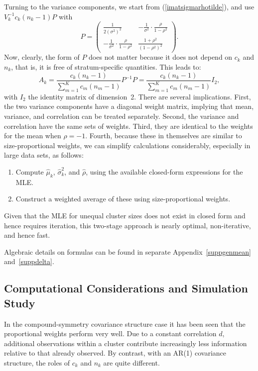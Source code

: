 \documentclass[11pt,a5paper,twoside]{book}
\begin{document}
Turning to the variance components, we start from (\ref{imatsigmarhotilde}), and use $V_k^{-1}c_k(n_k-1)P$ with
$$
P= \left(
\begin{array}{cc}
\frac{1}{2(\sigma^2)^2}
&
-\frac{1}{\sigma^2}\cdot\frac{\rho}{1-\rho^2}\\
-\frac{1}{\sigma^2}\cdot\frac{\rho}{1-\rho^2}&
\frac{1+\rho^2}{(1-\rho^2)^2}
\end{array}
\right).
$$
Now, clearly, the form of $P$ does not matter because it does not depend on $c_k$ and $n_k$, that is, it is free of stratum-specific quantities. This leads to:
$$A_k=
\frac{c_k(n_k-1)}{\sum_{m=1}^Kc_m(n_m-1)}P^{-1}P=\frac{c_k(n_k-1)}{\sum_{m=1}^Kc_m(n_m-1)}I_2,
$$
with $I_2$ the identity matrix of dimension~2.
There are several implications. First, the two variance components have a diagonal weight matrix, implying that mean, variance, and correlation can be treated separately. Second, the variance and correlation have the same sets of weights. Third, they are identical to the weights for the mean when $\rho=-1$. Fourth, because these in themselves are similar to size-proportional weights, we can simplify calculations considerably, especially in large data sets, as follows:
\begin{enumerate}
  \item Compute $\widehat{\mu}_k$, $\widehat{\sigma}^2_k$, and $\widehat{\rho}$, using the available closed-form expressions for the MLE.
  \item Construct a weighted average of these using size-proportional weights.
\end{enumerate}
Given that the MLE for unequal cluster sizes does not exist in closed form and hence requires iteration, this two-stage approach is nearly optimal, non-iterative, and hence fast.


Algebraic details on formulas can be found in separate Appendix~\ref{suppgenmean} and~\ref{suppdelta}.


\subsection{Computational Considerations and Simulation Study}
\label{seccompu}

In the compound-symmetry covariance structure case it has been seen that the proportional weights perform very well. Due to a constant correlation $d$, additional observations within a cluster contribute increasingly less  information relative to that already observed. By contrast, with an AR(1) covariance structure, 
the roles of $c_k$ and $n_k$ are quite different.
\end{document}
